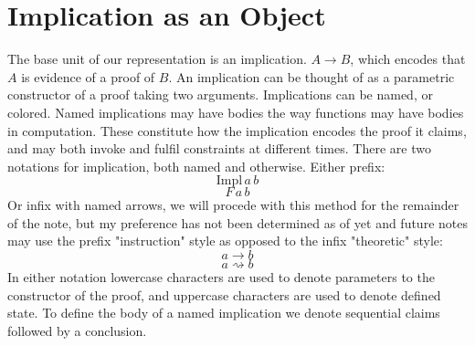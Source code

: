 \documentclass{article}
\begin{document}
	\section{Implication as an Object}
	The base unit of our representation is an implication. $A\rightarrow B$, which encodes that $A$ is evidence of a proof of $B$. An implication can be thought of as a parametric constructor of a proof taking two arguments. Implications can be named, or colored. Named implications may have bodies the way functions may have bodies in computation. These constitute how the implication encodes the proof it claims, and may both invoke and fulfil constraints at different times. There are two notations for implication, both named and otherwise. Either prefix:
	$$\text{Impl}\,a\,b$$
	$$F\,a\,b$$
	Or infix with named arrows, we will procede with this method for the remainder of the note, but my preference has not been determined as of yet and future notes may use the prefix "instruction" style as opposed to the infix "theoretic" style:
	$$a\rightarrow b$$
	$$a \rightsquigarrow b$$
	In either notation lowercase characters are used to denote parameters to the constructor of the proof, and uppercase characters are used to denote defined state. To define the body of a named implication we denote sequential claims followed by a conclusion.\\
\end{document}
